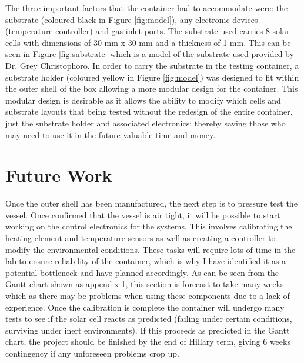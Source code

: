 \documentclass[a4paper,11pt]{article}
\begin{document}
\noindent The three important factors that the container had to accommodate were: the substrate (coloured black in Figure \ref{fig:model}), any electronic devices (temperature controller)  and gas inlet ports. The substrate used carries 8 solar cells with dimensions of 30 mm x 30 mm and a thickness of 1 mm. This can be seen in Figure \ref{fig:substrate} which is a model of the substrate used provided by Dr. Grey Christophoro. In order to carry the substrate in the testing container, a substrate holder (coloured yellow in Figure \ref{fig:model}) was designed to fit within the outer shell of the box allowing a more modular design for the container. This modular design is desirable as it allows the ability to modify which cells and substrate layouts that being tested without the redesign of the entire container, just the substrate holder and associated electronics; thereby saving those who may need to use it in the future valuable time and money. 
\section{Future Work}
Once the outer shell has been manufactured, the next step is to pressure test the vessel. Once confirmed that the vessel is air tight, it will be possible to start working on the control electronics for the systems. This involves calibrating the heating element and temperature sensors as well as creating a controller to modify the environmental conditions. These tasks will require lots of time in the lab to ensure reliability of the container, which is why I have identified it as a potential bottleneck and have planned accordingly. As can be seen from the Gantt chart shown as appendix 1, this section is forecast to take many weeks which as there may be problems when using these components due to a lack of experience. Once the calibration is complete the container will undergo many tests to see if the solar cell reacts as predicted (failing under certain conditions, surviving under inert environments). If this proceeds as predicted in the Gantt chart, the project should be finished by the end of Hillary term, giving 6 weeks contingency if any unforeseen problems crop up. 
\begin{singlespace}


\end{singlespace}
\end{document}
